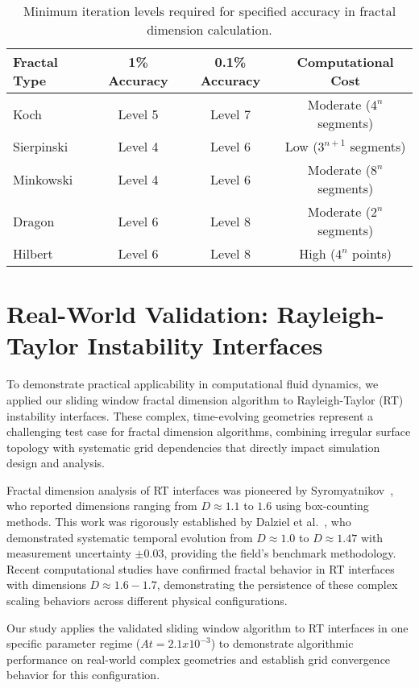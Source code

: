 \documentclass[preprint,12pt]{elsarticle}
\def\textbf#1{#1}%
\def\times{x}%
\begin{document}
\begin{table}[H]
\centering
\small
\begin{tabular}{@{}lccc@{}}
\toprule
\textbf{Fractal Type} & \textbf{1\% Accuracy} & \textbf{0.1\% Accuracy} & \textbf{Computational Cost} \\
\midrule
Koch & Level 5 & Level 7 & Moderate ($4^n$ segments) \\
Sierpinski & Level 4 & Level 6 & Low ($3^{n+1}$ segments) \\
Minkowski & Level 4 & Level 6 & Moderate ($8^n$ segments) \\
Dragon & Level 6 & Level 8 & Moderate ($2^n$ segments) \\
Hilbert & Level 6 & Level 8 & High ($4^n$ points) \\
\bottomrule
\end{tabular}
\caption{Minimum iteration levels required for specified accuracy in fractal dimension calculation.}
\label{tab:convergence_requirements}
\end{table}

\section{Real-World Validation: Rayleigh-Taylor Instability Interfaces}
\label{sec:rt_validation}

To demonstrate practical applicability in computational fluid dynamics, we applied our sliding window fractal dimension algorithm to Rayleigh-Taylor (RT) instability interfaces. These complex, time-evolving geometries represent a challenging test case for fractal dimension algorithms, combining irregular surface topology with systematic grid dependencies that directly impact simulation design and analysis.

Fractal dimension analysis of RT interfaces was pioneered by Syromyatnikov~\cite{syromyatnikov1993}, who reported dimensions ranging from $D \approx 1.1$ to $1.6$ using box-counting methods. This work was rigorously established by Dalziel et al.~\cite{dalziel1999}, who demonstrated systematic temporal evolution from $D \approx 1.0$ to $D \approx 1.47$ with measurement uncertainty $\pm 0.03$, providing the field's benchmark methodology. Recent computational studies have confirmed fractal behavior in RT interfaces with dimensions $D \approx 1.6-1.7$, demonstrating the persistence of these complex scaling behaviors across different physical configurations.

Our study applies the validated sliding window algorithm to RT interfaces in one specific parameter regime ($At = 2.1 \times 10^{-3}$) to demonstrate algorithmic performance on real-world complex geometries and establish grid convergence behavior for this configuration.
\end{document}
